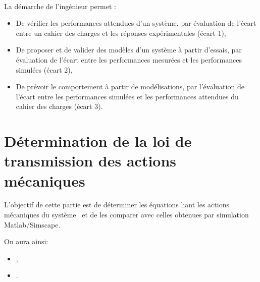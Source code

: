 


 \\

\graphicspath{{../../img/}}
\begin{center}
\def\svgwidth{\columnwidth}

\end{center}

La démarche de l’ingénieur permet :
\begin{itemize}
 \item De vérifier les performances attendues d’un système, par évaluation de l’écart entre un cahier des charges et les réponses expérimentales (écart 1),
 \item De proposer et de valider des modèles d’un système à partir d’essais, par évaluation de l’écart entre les performances mesurées et les performances simulées (écart 2),
 \item De prévoir le comportement à partir de modélisations, par l’évaluation de l’écart entre les performances simulées et les performances attendues du cahier des charges (écart 3).
\end{itemize}


\newpage

\section{Détermination de la loi de transmission des actions mécaniques}

L'objectif de cette partie est de déterminer les équations liant les actions mécaniques du système \systemes\ et de les comparer avec celles obtenues par simulation Matlab/Simscape.

On aura ainsi:
\begin{itemize}
 \item \entree,
 \item \sortie.
\end{itemize}

